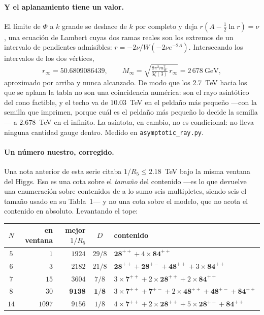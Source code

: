 \documentclass[11pt,a4paper]{article}
\newcommand{\rep}[1]{\mathbf{#1}}
\begin{document}
\paragraph{Y el aplanamiento tiene un valor.} El límite de $\Phi$ a $k$ grande se deshace de $k$
por completo y deja $r(A-\tfrac12\ln r)=\nu$, una ecuación de Lambert cuyas dos ramas reales son los
extremos de un intervalo de pendientes admisibles: $r=-2\nu/W(-2\nu e^{-2A})$. Intersecando los
intervalos de los dos vértices,
\begin{equation}\label{eq:rinf}
  r_\infty=50.6809086439,\qquad
  M_\infty=\sqrt{\tfrac{8\pi^2m_W^2}{3\zeta(3)}\,r_\infty}=2\,678~\text{GeV},
\end{equation}
aproximado por arriba y nunca alcanzado. De modo que los $2.7$~TeV hacia los que se aplana la tabla no
son una coincidencia numérica: son el rayo asintótico del cono factible, y el techo va de
$10.03$~TeV en el peldaño más pequeño ---con la semilla que \cite{KM25} imprimen, porque cuál es el
peldaño más pequeño lo decide la semilla--- a $2.678$~TeV en el infinito. La asíntota, en cambio, no
es condicional: no lleva ninguna cantidad gauge dentro. Medido en
\texttt{asymptotic\_\allowbreak ray.py}.

\paragraph{Un número nuestro, corregido.} Una nota anterior de esta serie citaba $1/R_5\le2.18$~TeV
bajo la misma ventana del Higgs. Eso es una cota sobre el \emph{tamaño} del contenido ---es lo que
devuelve una enumeración sobre contenidos de a lo sumo seis multipletes, siendo seis el tamaño usado
en su Tabla~1--- y no una cota sobre el modelo, que no acota el contenido en absoluto. Levantando el
tope:

\begin{center}\small
{}
\begin{tabular}{crrcl}
\toprule
\rowcolor{hdrblue!10}$N$ & en ventana & mejor $1/R_5$ & $D$ & contenido\\
\midrule
$5$  & $1$    & $1924$ & $29/8$ & $\rep{28}^{++}+4\times\rep{84}^{++}$\\
$6$  & $3$    & $2182$ & $21/8$ & $\rep{28}^{++}+\rep{28}^{+-}+\rep{48}^{++}+3\times\rep{84}^{++}$\\
$7$  & $15$   & $3604$ & $7/8$  & $3\times\rep7^{++}+2\times\rep{28}^{++}+2\times\rep{84}^{++}$\\
\rowcolor{amber!14}$8$  & $30$   & $\mathbf{9138}$ & $\mathbf{1/8}$ & $3\times\rep7^{++}+\rep7^{+-}+2\times\rep{48}^{++}+\rep{48}^{+-}+\rep{84}^{++}$\\
$14$ & $1097$ & $9156$ & $1/8$  & $4\times\rep7^{++}+2\times\rep{28}^{++}+5\times\rep{28}^{+-}+\rep{84}^{++}$\\
\bottomrule
\end{tabular}
\end{center}
\end{document}
